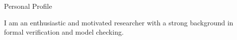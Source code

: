 \documentclass{resume} %
\begin{document}

\begin{rSection}{Personal Profile}


I am an enthusiastic and motivated researcher with a strong background in formal verification
and model checking. 


\end{rSection}


\vspace{1ex}
\end{document}
